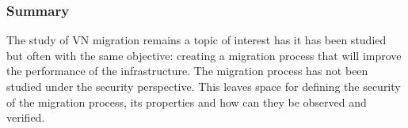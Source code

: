 \subsubsection{Summary}
The study of VN migration remains a topic of interest has it has been studied but often with the same objective: creating a migration process that will improve the performance of the infrastructure. 
The migration process has not been studied under the security perspective.
This leaves space for defining the security of the migration process, its properties and how can they be observed and verified.